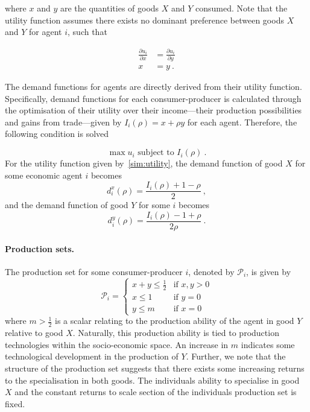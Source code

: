 where $x$ and $y$ are the quantities of goods $X$ and $Y$ consumed. Note that the utility function assumes there exists no dominant preference between goods $X$ and $Y$ for agent $i$, such that

\begin{align*}
\frac{\partial u_{i}}{\partial x} &= \frac{\partial u_{i}}{\partial y} \\
x &= y~.
\end{align*}

The demand functions for agents are directly derived from their utility function. Specifically, demand functions for each consumer-producer is calculated through the optimisation of their utility over their income---their production possibilities and gains from trade---given by $I_{i}(\rho) = x + \rho y$ for each agent. Therefore, the following condition is solved

\begin{equation}
\max u_{i} \mbox{ subject to } I_{i}(\rho)~.
\end{equation}
For the utility function given by~\ref{sim:utility}, the demand function of good $X$ for some economic agent $i$ becomes
\begin{equation}
d_{i}^{x} (\rho) = \frac{I_{i}(\rho) + 1 - \rho}{2}~,
\end{equation}
and the demand function of good $Y$ for some $i$ becomes
\begin{equation}
d_{i}^{y} (\rho) = \frac{I_{i}(\rho) - 1 + \rho}{2 \rho}~.
\end{equation}

\paragraph{Production sets.}

The production set for some consumer-producer $i$, denoted by $\mathcal{P}_{i}$, is given by
\[ \mathcal{P}_{i} = \left\{ \begin{array}{ll}
         x + y \leqslant \frac{1}{2} & \mbox{if $x,y > 0$}\\
		 x \leqslant 1 & \mbox{if $y = 0$}\\
         y \leqslant m & \mbox{if $x = 0$}\end{array} \right. \]
where $m > \frac{1}{2}$ is a scalar relating to the production ability of the agent in good $Y$ relative to good $X$. Naturally, this production ability is tied to production technologies within the socio-economic space. An increase in $m$ indicates some technological development in the production of $Y$. Further, we note that the structure of the production set suggests that there exists some increasing returns to the specialisation in both goods. The individuals ability to specialise in good $X$ and the constant returns to scale section of the individuals production set is fixed.

